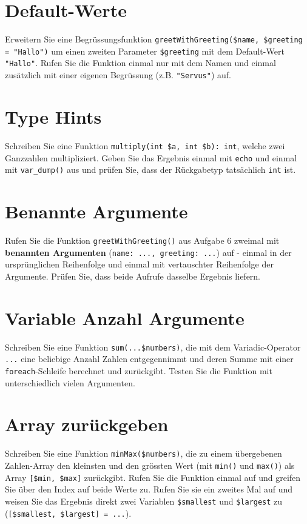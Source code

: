 \documentclass[a4paper,12pt]{article}
\begin{document}
\section{Default-Werte}

Erweitern Sie eine Begrüssungsfunktion \texttt{greetWithGreeting(\$name, \$greeting = "Hallo")} um einen zweiten Parameter \texttt{\$greeting} mit dem Default-Wert \texttt{"Hallo"}. Rufen Sie die Funktion einmal nur mit dem Namen und einmal zusätzlich mit einer eigenen Begrüssung (z.B. \texttt{"Servus"}) auf.

\section{Type Hints}

Schreiben Sie eine Funktion \texttt{multiply(int \$a, int \$b): int}, welche zwei Ganzzahlen multipliziert. Geben Sie das Ergebnis einmal mit \texttt{echo} und einmal mit \texttt{var\_dump()} aus und prüfen Sie, dass der Rückgabetyp tatsächlich \texttt{int} ist.

\section{Benannte Argumente}

Rufen Sie die Funktion \texttt{greetWithGreeting()} aus Aufgabe 6 zweimal mit \textbf{benannten Argumenten} (\texttt{name: ..., greeting: ...}) auf - einmal in der ursprünglichen Reihenfolge und einmal mit vertauschter Reihenfolge der Argumente. Prüfen Sie, dass beide Aufrufe dasselbe Ergebnis liefern.

\section{Variable Anzahl Argumente}

Schreiben Sie eine Funktion \texttt{sum(...\$numbers)}, die mit dem Variadic-Operator \texttt{...} eine beliebige Anzahl Zahlen entgegennimmt und deren Summe mit einer \texttt{foreach}-Schleife berechnet und zurückgibt. Testen Sie die Funktion mit unterschiedlich vielen Argumenten.

\section{Array zurückgeben}

Schreiben Sie eine Funktion \texttt{minMax(\$numbers)}, die zu einem übergebenen Zahlen-Array den kleinsten und den grössten Wert (mit \texttt{min()} und \texttt{max()}) als Array \texttt{[\$min, \$max]} zurückgibt. Rufen Sie die Funktion einmal auf und greifen Sie über den Index auf beide Werte zu. Rufen Sie sie ein zweites Mal auf und weisen Sie das Ergebnis direkt zwei Variablen \texttt{\$smallest} und \texttt{\$largest} zu (\texttt{[\$smallest, \$largest] = ...}).
\end{document}
